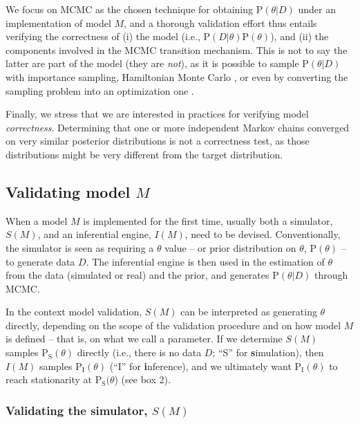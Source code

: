 \documentclass[oneside]{article}
\begin{document}
We focus on MCMC as the chosen technique for obtaining $\text{P}(\theta|D)$
under an implementation of model $M$,
and a thorough validation effort thus entails verifying the
correctness of (i) the model (i.e., $\text{P}(D|\theta)\text{P}(\theta)$), and (ii)
the components involved in the MCMC transition mechanism.
This is not to say the latter are part of the model (they are
\emph{not}), as it is possible to sample $\text{P}(\theta|D)$ with importance sampling, Hamiltonian
Monte Carlo \citep{hmc}, or even by converting the sampling problem into an
optimization one \citep{zhang18}.

Finally, we stress that we are interested in practices for verifying model
\emph{correctness}.
Determining that one or more independent Markov chains converged on very
similar posterior distributions is not a correctness test, as those
distributions might be very different from the target distribution.

\subsection*{Validating model $M$}

When a model $M$ is implemented for the first time, usually both a
simulator, $S(M)$, and an
inferential engine, $I(M)$, need to be devised.
Conventionally, the simulator is seen as requiring a $\theta$ value -- or prior distribution on $\theta$,
$\text{P}(\theta)$ -- to generate data $D$.
The inferential engine is then used in the estimation of $\theta$ from the
data (simulated or real) and the prior, and generates
$\text{P}(\theta|D)$ through MCMC.


In the context model validation, $S(M)$ can be interpreted as generating
$\theta$ directly, depending on the scope of the validation procedure
and on how model $M$ is defined -- that is, on what we call a
parameter. 
If we determine $S(M)$ samples $\text{P}_{\text{S}}(\theta)$ directly (i.e.,
there is no data $D$; ``S'' for \textbf{s}imulation), then $I(M)$
samples $\text{P}_{\text{I}}(\theta)$ (``I'' for \textbf{i}nference),
and we ultimately want $\text{P}_{\text{I}}(\theta)$ to reach
stationarity at $\text{P}_{\text{S}}(\theta$) (see box 2). 

\subsubsection*{Validating the simulator,
  $S(M)$}\label{verify-correctness-of-simulator-implementation}
\end{document}
